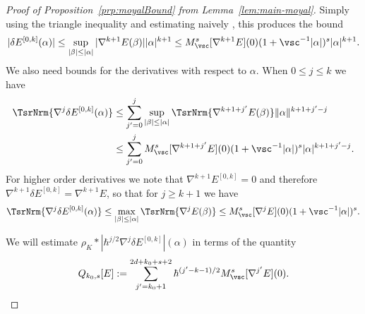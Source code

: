 \documentclass{article}
\numberwithin{equation}{section}
\begin{document}
\begin{proof}[Proof of Proposition~\ref{prp:moyalBound} from Lemma~\ref{lem:main-moyal}]
	Simply using the triangle inequality and estimating naively
, this produces the bound
	\[
	|\delta E^{[0,k]}(\alpha)| \leq
	\sup_{|\beta|\leq |\alpha|} |\nabla^{k+1}E(\beta)|
	|\alpha|^{k+1}
	\leq  M_\vsc^s[\nabla^{k+1}E](0) (1+\vsc^{-1}|\alpha|)^{s} |\alpha|^{k+1}.
	\]
	We also need bounds for the derivatives with respect to $\alpha$.  When $0\leq j\leq k$ we have 
	\begin{equation}
		\label{eq:local-low-bds}
		\begin{split}
			\TsrNrm{\nabla^j \delta E^{[0,k]}(\alpha)} &\leq
			\sum_{j'=0}^j
			\sup_{|\beta|\leq|\alpha|} \TsrNrm{\nabla^{k+1+j'} E(\beta)}
			\|\alpha\|^{k+1+j'-j} \\
			&\leq 
			\sum_{j'=0}^j
			M_\vsc^s[\nabla^{k+1+j'}E](0) (1+\vsc^{-1}|\alpha|)^s |\alpha|^{k+1+j'-j}.
		\end{split}
	\end{equation}
	For higher order derivatives we note that $\nabla^{k+1} E^{[0,k]} = 0$ and therefore
	$\nabla^{k+1} \delta E^{[0,k]} = \nabla^{k+1} E$, so that for $j\geq k+1$ we have
	\begin{equation}
		\label{eq:higher-grad-bds}
		\TsrNrm{\nabla^j \delta E^{[0,k]}(\alpha)} \leq \max_{|\beta|\leq |\alpha|} \TsrNrm{\nabla^jE(\beta)}
		\leq M_\vsc^s[\nabla^jE](0) (1+\vsc^{-1}|\alpha|)^s.
	\end{equation}
	
	We will estimate $\rho_K \ast |\hbar^{j/2}\nabla^j \delta E^{[0,k]}|(\alpha)$ in terms of the
	quantity
	\[
	Q_{k_0,s}[E] := \sum_{j'=k_0+1}^{2d+k_0+s+2} \hbar^{(j'-k-1)/2}M_\vsc^s[\nabla^{j'}E](0).
	\]
	

\end{proof}
\end{document}
